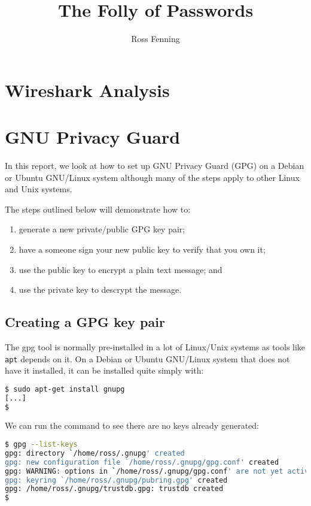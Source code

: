 \documentclass{report}
\title{The Folly of Passwords}
\author{Ross Fenning}
\begin{document}
\maketitle
\tableofcontents

\chapter{Wireshark Analysis}

\chapter{GNU Privacy Guard}

In this report, we look at how to set up GNU Privacy Guard (GPG)
on a Debian or Ubuntu GNU/Linux
system although many of the steps apply to other Linux and Unix systems.

The steps outlined below will demonstrate how to:

\begin{enumerate}
\item generate a new private/public GPG key pair;
\item have a someone sign your new public key to verify that you own it;
\item use the public key to encrypt a plain text message; and
\item use the private key to descrypt the message.
\end{enumerate}

\section{Creating a GPG key pair}

The gpg tool is normally pre-installed in a lot of Linux/Unix systems as
tools like \texttt{apt} depends on it. On
a Debian or Ubuntu GNU/Linux system that does not have it installed, it
can be installed quite simply with:

\begin{lstlisting}[language=bash]
$ sudo apt-get install gnupg
[...]
$
\end{lstlisting}

We can run the command to see there are no keys already generated:

\begin{lstlisting}[language=bash]
$ gpg --list-keys
gpg: directory `/home/ross/.gnupg' created
gpg: new configuration file `/home/ross/.gnupg/gpg.conf' created
gpg: WARNING: options in `/home/ross/.gnupg/gpg.conf' are not yet active during this run
gpg: keyring `/home/ross/.gnupg/pubring.gpg' created
gpg: /home/ross/.gnupg/trustdb.gpg: trustdb created
$
\end{lstlisting}
\end{document}
